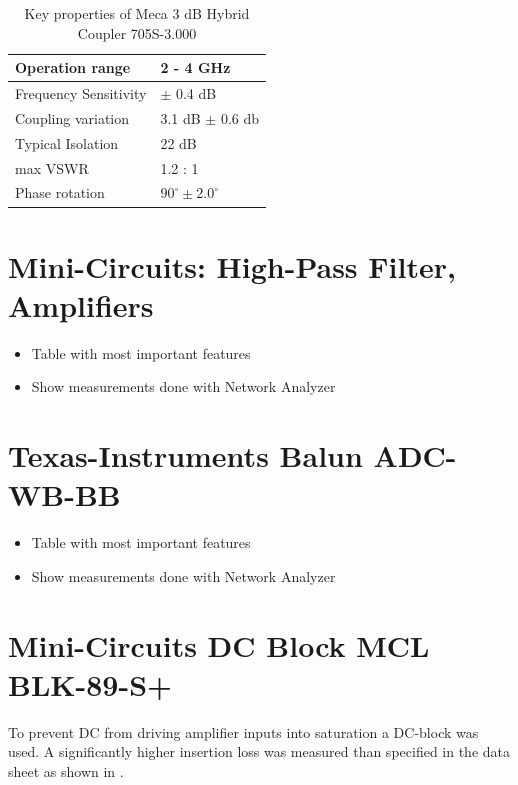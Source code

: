 \begin{table}[h]
  \centering
  \begin{tabular}{|l|l|}
    \hline
    Operation range & 2 - 4 GHz \\ \hline
    Frequency Sensitivity & $\pm$ 0.4 dB \\ \hline
    Coupling variation & 3.1 dB $\pm$ 0.6 db \\ \hline
    Typical Isolation & 22 dB \\ \hline
    max \gls{VSWR} & 1.2 : 1 \\ \hline
    Phase rotation & $90^\circ \pm 2.0^\circ$ \\ \hline
  \end{tabular}
  \caption{Key properties of Meca 3 dB Hybrid Coupler 705S-3.000}
  \label{tab:awg}
\end{table}


\section{Mini-Circuits: High-Pass Filter, Amplifiers}
\begin{itemize}
\item Table with most important features
\item Show measurements done with Network Analyzer
\end{itemize}

\section{Texas-Instruments Balun ADC-WB-BB}
\label{sec:comp_balun}
\begin{itemize}
\item Table with most important features
\item Show measurements done with Network Analyzer
\end{itemize}

\section{Mini-Circuits DC Block MCL BLK-89-S+}
\label{sec:comp_dc_block}
To prevent \gls{DC} from driving amplifier inputs into saturation
a \gls{DC}-block was used. A significantly higher insertion loss was
measured than specified in the data sheet as shown in
.

